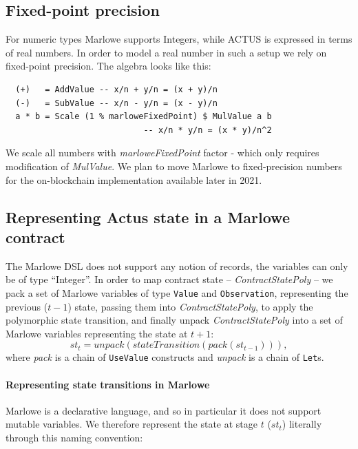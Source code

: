 \documentclass[runningheads]{llncs}
\newcommand{\ident}[1]{\mbox{\emph{#1}}}
\begin{document}
\subsection{Fixed-point precision }

For numeric types Marlowe supports Integers, while ACTUS is expressed in terms
of real numbers. In order to model a real number in such a setup
we rely on fixed-point precision. The algebra looks like this: 
\begin{verbatim}
  (+)   = AddValue -- x/n + y/n = (x + y)/n
  (-)   = SubValue -- x/n - y/n = (x - y)/n
  a * b = Scale (1 % marloweFixedPoint) $ MulValue a b 
                            -- x/n * y/n = (x * y)/n^2
\end{verbatim}
We scale all numbers with \emph{marloweFixedPoint} factor - which only requires modification of \emph{MulValue}.
\noindent
We plan to move Marlowe to fixed-precision numbers for the on-blockchain implementation available later in 2021.

\subsection{Representing Actus state in a Marlowe contract}

The Marlowe DSL does not support any notion of records,
the variables can only be of type ``Integer''. In order to
map contract state -- \emph{ContractStatePoly} -- we pack a set of Marlowe
variables of type \texttt{Value} and \texttt{Observation}, representing the previous ($t-1$) state, passing them into
\emph{ContractStatePoly}, to apply the polymorphic state transition, and
finally unpack \emph{ContractStatePoly} into a set of Marlowe variables representing the 
 state at $t+1$:
\noindent 
\begin{equation*}
st_{t}=unpack(stateTransition(pack(st_{t-1}))),
\end{equation*}
\noindent
where \emph{pack} is a chain of \texttt{UseValue} constructs and \ident{unpack} is a chain of
\texttt{Let}s.

\paragraph{Representing state transitions in Marlowe}

Marlowe is a declarative language, and so in particular it does not support mutable variables. We therefore represent the state at stage $t$ ($st_{t}$) literally through this naming convention:
\end{document}
